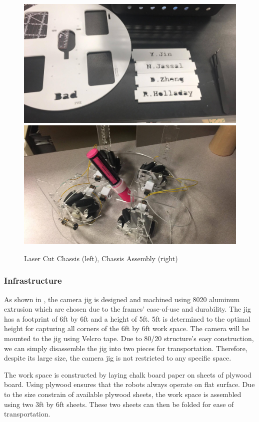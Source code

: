 \begin{figure}[h!]
\centering
\includegraphics[width=0.49\columnwidth]{figs/chassis1.png}
\includegraphics[width=0.49\columnwidth]{figs/chassis2.png}
\caption{Laser Cut Chassis (left), Chassis Assembly (right)}
\label{fig:so4}
\end{figure}

\subsubsection{Infrastructure}
\label{sec:me_infrastructure}
As shown in , the camera jig is designed and machined using 8020 aluminum extrusion which are chosen due to the frames’ ease-of-use and durability. The jig has a footprint of 6ft by 6ft and a height of 5ft.  5ft is determined to the optimal height for capturing all corners of the 6ft by 6ft work space. The camera will be mounted to the jig using Velcro tape. Due to 80/20 structure’s easy construction, we can simply disassemble the jig into two pieces for transportation. Therefore, despite its large size, the camera jig is not restricted to any specific space. 

The work space is constructed by laying chalk board paper on sheets of plywood board. Using plywood ensures that the robots always operate on flat surface. Due to the size constrain of available plywood sheets, the work space is assembled using two 3ft by 6ft sheets. These two sheets can then be folded for ease of transportation. 

